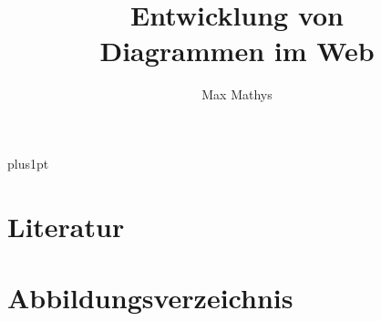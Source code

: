 \documentclass[12pt]{document}  %
\title{Entwicklung von\\[1ex]     %
       Diagrammen im Web}   %
\author{Max Mathys}             %
\begin{document}
\baselineskip=18pt plus1pt

\setcounter{secnumdepth}{3}
\setcounter{tocdepth}{3}


\maketitle                  %


\begin{romanpages}          %
\tableofcontents            %
\end{romanpages}            %



	
	



\newpage
\appendix

\chapter{Literatur}
\printbibliography[heading=none]     %

\newpage
\chapter{Abbildungsverzeichnis}
\makeatletter
{} %
\makeatother

\newpage

\end{document}
